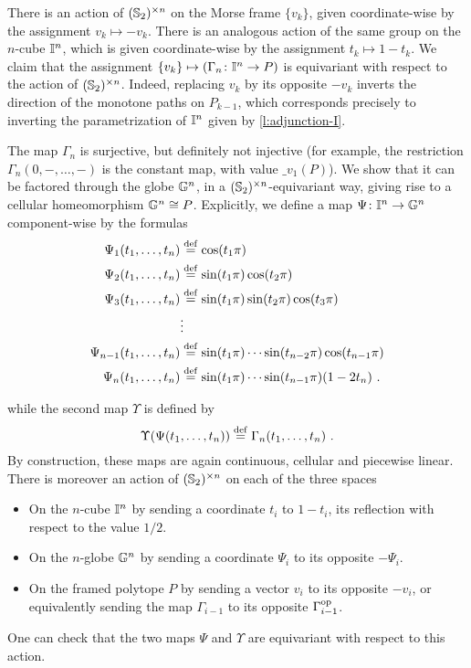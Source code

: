 There is an action of $(\mathbb{S}_2)^{\times n}$ on the Morse frame $\{ v_k \}$, given coordinate-wise by the assignment $v_k \mapsto -v_k$. 
There is an analogous action of the same group on the $n$-cube $\mathbb{I}^n$, which is given coordinate-wise by the assignment $t_k \mapsto 1-t_k$. 
We claim that the assignment $\{v_k\} \mapsto (\Gamma_n \colon \mathbb{I}^n \to P)$ is equivariant with respect to the action of $(\mathbb{S}_2)^{\times n}$.
Indeed, replacing $v_k$ by its opposite $-v_k$ inverts the direction of the monotone paths on $P_{k-1}$, which corresponds precisely to inverting the parametrization of $\mathbb{I}^n$ given by \cref{l:adjunction-I}.

The map $\Gamma_n$ is surjective, but definitely not injective (for example, the restriction $\Gamma_n(0,-,\ldots,-)$ is the constant map, with value $\bm_{v_1}(P)$). 
We show that it can be factored through the globe $\mathbb{G}^n$, in a $(\mathbb{S}_2)^{\times n}$-equivariant way, giving rise to a cellular homeomorphism $\mathbb{G}^n \cong P$. 
Explicitly, we define a map $\Psi \colon \mathbb{I}^n \to \mathbb{G}^n$ component-wise by the formulas
\begin{align*}
	\Psi_1(t_1,\ldots,t_n) & \stackrel{\mathrm{def}}{=} \cos(t_1 \pi) \\
	\Psi_2(t_1,\ldots,t_n) & \stackrel{\mathrm{def}}{=} \sin(t_1 \pi)\cos(t_2\pi) \\
	\Psi_3(t_1,\ldots,t_n) & \stackrel{\mathrm{def}}{=} \sin(t_1 \pi)\sin(t_2\pi)\cos(t_3\pi) \\
	 & \vdots \\
	\Psi_{n-1}(t_1,\ldots,t_n) & \stackrel{\mathrm{def}}{=} \sin(t_1 \pi) \cdots \sin(t_{n-2} \pi) \cos(t_{n-1} \pi) \\
	\Psi_n(t_1,\ldots,t_n) & \stackrel{\mathrm{def}}{=}  \sin(t_1 \pi) \cdots \sin(t_{n-1} \pi)  (1-2t_n)\ .
\end{align*}

while the second map $\Upsilon$ is defined by
\[
\Upsilon(\Psi(t_1,\ldots,t_n)) \stackrel{\mathrm{def}}{=} \Gamma_n(t_1,\ldots, t_n)\ .
\]
By construction, these maps are again continuous, cellular and piecewise linear.
There is moreover an action of $(\mathbb{S}_2)^{\times n}$ on each of the three spaces
\begin{itemize}
	\item On the $n$-cube $\mathbb{I}^n$ by sending a coordinate $t_i$ to $1-t_i$, its reflection with respect to the value $1/2$.
	\item On the $n$-globe $\mathbb{G}^n$ by sending a coordinate $\Psi_i$ to its opposite $-\Psi_i$.
	\item On the framed polytope $P$ by sending a vector $v_i$ to its opposite $-v_i$, or equivalently sending the map $\Gamma_{i-1}$ to its opposite $\Gamma_{i-1}^{\mathrm{op}}$.
\end{itemize}
One can check that the two maps $\Psi$ and $\Upsilon$ are equivariant with respect to this action.

